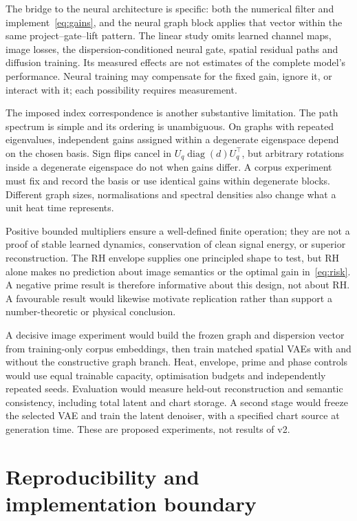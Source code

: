 \documentclass[10pt]{article}
\newcommand{\Uq}{U_q}
\newcommand{\diag}{\operatorname{diag}}
\newcommand{\code}[1]{\texttt{\detokenize{#1}}}
\begin{document}
The bridge to the neural architecture is specific: both the numerical
filter and \code{ModalGate} implement~\eqref{eq:gains}, and the neural
graph block applies that vector within the same project--gate--lift
pattern. The linear study omits learned channel maps, image losses,
the dispersion-conditioned neural gate, spatial residual paths and
diffusion training. Its measured effects are not estimates of the
complete model's performance. Neural training may compensate for the
fixed gain, ignore it, or interact with it; each possibility requires
measurement.

The imposed index correspondence is another substantive limitation.
The path spectrum is simple and its ordering is unambiguous. On graphs
with repeated eigenvalues, independent gains assigned within a
degenerate eigenspace depend on the chosen basis. Sign flips cancel in
$\Uq\diag(d)\Uq^\top$, but arbitrary rotations inside a degenerate
eigenspace do not when gains differ. A corpus experiment must fix and
record the basis or use identical gains within degenerate blocks.
Different graph sizes, normalisations and spectral densities also
change what a unit heat time represents.

Positive bounded multipliers ensure a well-defined finite operation;
they are not a proof of stable learned dynamics, conservation of clean
signal energy, or superior reconstruction. The RH envelope supplies
one principled shape to test, but RH alone makes no prediction about
image semantics or the optimal gain in~\eqref{eq:risk}. A negative
prime result is therefore informative about this design, not about
RH. A favourable result would likewise motivate replication rather
than support a number-theoretic or physical conclusion.

A decisive image experiment would build the frozen graph and dispersion
vector from training-only corpus embeddings, then train matched spatial
VAEs with and without the constructive graph branch. Heat, envelope,
prime and phase controls would use equal trainable capacity, optimisation
budgets and independently repeated seeds. Evaluation would measure
held-out reconstruction and semantic consistency, including total
latent and chart storage. A second stage would freeze the selected VAE
and train the latent denoiser, with a specified chart source at
generation time. These are proposed experiments, not results of v2.

\section{Reproducibility and implementation boundary}
\label{sec:repro}
\end{document}
